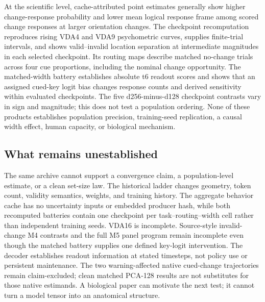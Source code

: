 \documentclass[11pt,a4paper]{article}
\begin{document}
At the scientific level, cache-attributed point estimates generally show higher change-response probability and lower mean logical response frame among scored change responses at larger orientation changes. The checkpoint recomputation reproduces rising VDA4 and VDA9 psychometric curves, supplies finite-trial intervals, and shows valid--invalid location separation at intermediate magnitudes in each selected checkpoint. Its routing maps describe matched no-change trials across four cue proportions, including the nominal change opportunity. The matched-width battery establishes absolute t6 readout scores and shows that an assigned cued-key logit bias changes response counts and derived sensitivity within evaluated checkpoints. The five d256-minus-d128 checkpoint contrasts vary in sign and magnitude; this does not test a population ordering. None of these products establishes population precision, training-seed replication, a causal width effect, human capacity, or biological mechanism.

\subsection{What remains unestablished}
The same archive cannot support a convergence claim, a population-level estimate, or a clean set-size law. The historical ladder changes geometry, token count, validity semantics, weights, and training history. The aggregate behavior cache has no uncertainty inputs or embedded producer hash, while both recomputed batteries contain one checkpoint per task--routing--width cell rather than independent training seeds. VDA16 is incomplete. Source-style invalid-change M4 contrasts and the full M5 panel program remain incomplete even though the matched battery supplies one defined key-logit intervention. The decoder establishes readout information at stated timesteps, not policy use or persistent maintenance. The two warning-affected native cued-change trajectories remain claim-excluded; clean matched PCA-128 results are not substitutes for those native estimands. A biological paper can motivate the next test; it cannot turn a model tensor into an anatomical structure.
\end{document}
